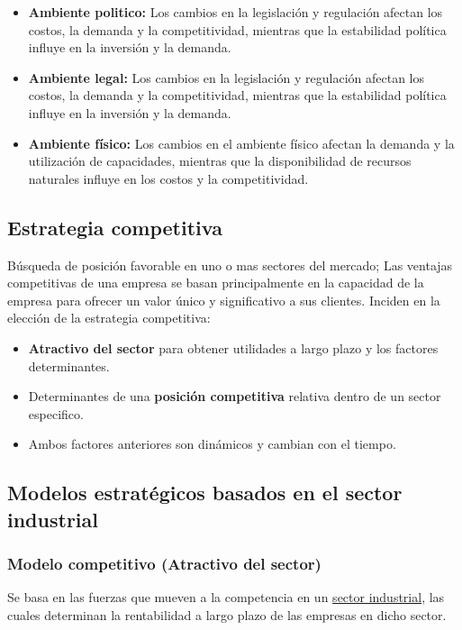 \documentclass{templateNote}
\begin{document}
\begin{itemize}
        \item \textbf{Ambiente politico:} Los cambios en la legislación y regulación afectan los costos, la demanda y la competitividad, mientras que la estabilidad política influye en la inversión y la demanda.
        \item \textbf{Ambiente legal:} Los cambios en la legislación y regulación afectan los costos, la demanda y la competitividad, mientras que la estabilidad política influye en la inversión y la demanda.
        \item \textbf{Ambiente físico:} Los cambios en el ambiente físico afectan la demanda y la utilización de capacidades, mientras que la disponibilidad de recursos naturales influye en los costos y la competitividad.
    
    \end{itemize}


\subsection{Estrategia competitiva}
\noindent Búsqueda de posición favorable en uno o mas sectores del mercado; Las ventajas competitivas de una empresa se basan principalmente en la capacidad de la empresa para ofrecer un valor único y significativo a sus clientes. Inciden en la elección de la estrategia competitiva:
\begin{itemize}
    \item \textbf{Atractivo del sector} para obtener utilidades a largo plazo y los factores determinantes.
    \item Determinantes de una \textbf{posición competitiva} relativa dentro de un sector especifico.
    \item Ambos factores anteriores son dinámicos y cambian con el tiempo.
\end{itemize}

\subsection{Modelos estratégicos basados en el sector industrial}

\subsubsection{Modelo competitivo (Atractivo del sector)}
\noindent Se basa en las fuerzas que mueven a la competencia en un \hyperlink{sec_ind}{sector industrial}, las cuales determinan la rentabilidad a largo plazo de las empresas en dicho sector.\\
\end{document}
